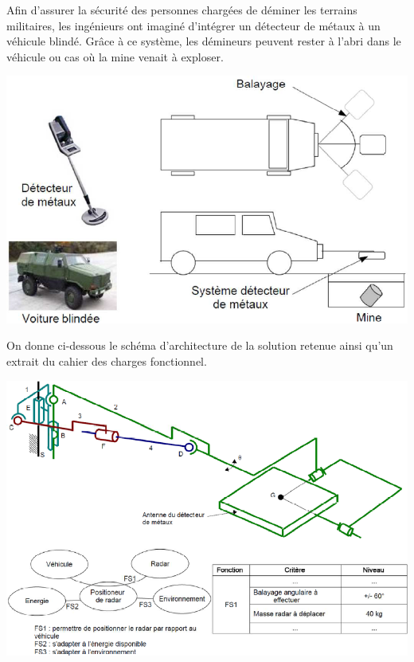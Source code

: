 \documentclass[10pt,oneside]{article}
\begin{document}
\begin{minipage}[c]{.45\linewidth}
Afin d'assurer la sécurité des personnes chargées de déminer les terrains militaires, les ingénieurs ont imaginé d'intégrer un détecteur de métaux à un véhicule blindé. Grâce à ce système, les démineurs peuvent rester à l'abri dans le véhicule ou cas où la mine venait à exploser.
\end{minipage}\hfill
\begin{minipage}[c]{.5\linewidth}
\begin{center}
\includegraphics[width=\textwidth]{png/img1}
\end{center}
\end{minipage}

\vspace{.5cm}

On donne ci-dessous le schéma d'architecture de la solution retenue ainsi qu'un extrait du cahier des charges fonctionnel.

\begin{center}
\includegraphics[width=.9\textwidth]{png/img2}
\end{center}
\end{document}
